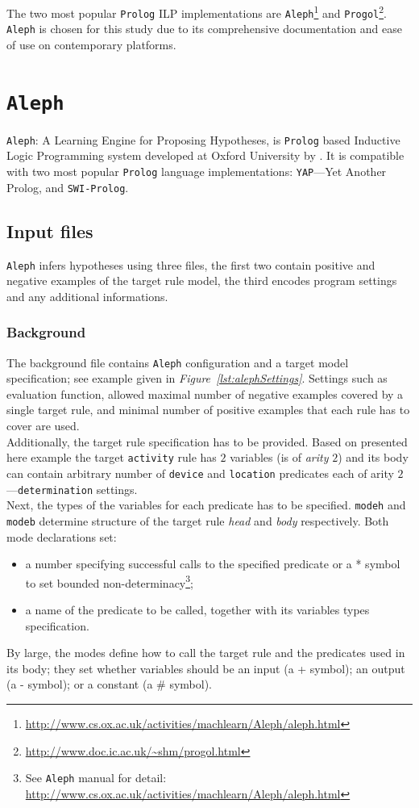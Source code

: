 \documentclass[10pt, a4paper, pdflatex, leqno, twoside, openright]{report}
\begin{document}
The two most popular \texttt{Prolog} ILP implementations are \texttt{Aleph}\footnote{\url{http://www.cs.ox.ac.uk/activities/machlearn/Aleph/aleph.html}} and \texttt{Progol}\footnote{\url{http://www.doc.ic.ac.uk/~shm/progol.html}}. \texttt{Aleph} is chosen for this study due to its comprehensive documentation and ease of use on contemporary platforms.

  \section{\texttt{Aleph}}
\texttt{Aleph}: A Learning Engine for Proposing Hypotheses, is \texttt{Prolog} based Inductive Logic Programming system developed at Oxford University by \citeauthor{muggleton1994inductive}. It is compatible with two most popular \texttt{Prolog} language implementations: \texttt{YAP}---Yet Another Prolog, and \texttt{SWI-Prolog}.

    \subsection{Input files}
\texttt{Aleph} infers hypotheses using three files, the first two contain positive and negative examples of the target rule model, the third encodes program settings and any additional informations.

      \subsubsection{Background}
The background file contains \texttt{Aleph} configuration and a target model specification; see example given in \emph{Figure~\ref{lst:alephSettings}}. Settings such as evaluation function, allowed maximal number of negative examples covered by a single target rule, and minimal number of positive examples that each rule has to cover are used.\\

Additionally, the target rule specification has to be provided. Based on presented here example the target \texttt{activity} rule has $2$ variables (is of \emph{arity} $2$) and its body can contain arbitrary number of \texttt{device} and \texttt{location} predicates each of arity $2$---\texttt{determination} settings.\\
Next, the types of the variables for each predicate has to be specified. \texttt{modeh} and \texttt{modeb} determine structure of the target rule \emph{head} and \emph{body} respectively. Both mode declarations set:
\begin{itemize}
\item a number specifying successful calls to the specified predicate or a * symbol to set bounded non-determinacy\footnote{See \texttt{Aleph} manual for detail: \url{http://www.cs.ox.ac.uk/activities/machlearn/Aleph/aleph.html}};
\item a name of the predicate to be called, together with its variables types specification.
\end{itemize}
By large, the modes define how to call the target rule and the predicates used in its body; they set whether variables should be an input (a + symbol); an output (a - symbol); or a constant (a \# symbol).\\
\end{document}
